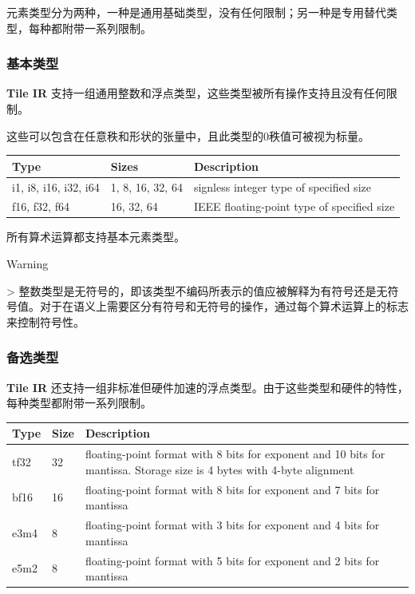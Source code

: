 \documentclass{article}
\begin{document}
元素类型分为两种，一种是通用基础类型，没有任何限制；另一种是专用替代类型，每种都附带一系列限制。


\subsubsection{基本类型}

\textbf{Tile IR} 支持一组通用整数和浮点类型，这些类型被所有操作支持且没有任何限制。

这些可以包含在任意秩和形状的张量中，且此类型的0秩值可被视为标量。


\begin{longtable}{l|l|l}
\hline
Type & Sizes & Description \\ \hline
i1, i8, i16, i32, i64 & 1, 8, 16, 32, 64 & signless integer type of specified size \\ \hline
f16, f32, f64 & 16, 32, 64 & IEEE floating-point type of specified size \\ \hline
\end{longtable}

所有算术运算都支持基本元素类型。


Warning

> 整数类型是无符号的，即该类型不编码所表示的值应被解释为有符号还是无符号值。对于在语义上需要区分有符号和无符号的操作，通过每个算术运算上的标志来控制符号性。



\subsubsection{备选类型}

\textbf{Tile IR} 还支持一组非标准但硬件加速的浮点类型。由于这些类型和硬件的特性，每种类型都附带一系列限制。


\begin{longtable}{l|l|l}
\hline
Type & Size & Description \\ \hline
tf32 & 32 & floating-point format with 8 bits for exponent and 10 bits for mantissa. Storage size is 4 bytes with 4-byte alignment \\ \hline
bf16 & 16 & floating-point format with 8 bits for exponent and 7 bits for mantissa \\ \hline
e3m4 & 8 & floating-point format with 3 bits for exponent and 4 bits for mantissa \\ \hline
e5m2 & 8 & floating-point format with 5 bits for exponent and 2 bits for mantissa \\ \hline
\end{longtable}
\end{document}

